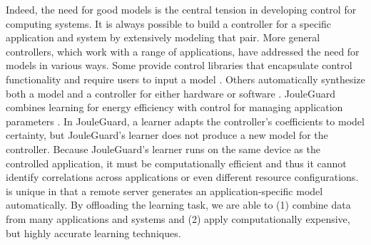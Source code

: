 Indeed, the need for good models is the central tension in developing
control for computing systems.  It is always possible to build a
controller for a specific application and system by extensively
modeling that pair.  More general controllers, which work with a range
of applications, have addressed the need for models in various ways.
Some provide control libraries that encapsulate control functionality
and require users to input a model
\cite{ControlWare,Sojka,Rajkumar,POET,SWiFT}.  Others automatically
synthesize both a model and a controller for either hardware
\cite{josep-isca2016} or software \cite{ICSE2014,FSE2015}.  JouleGuard
combines learning for energy efficiency with control for managing
application parameters \cite{JouleGuard}.  In JouleGuard, a learner
adapts the controller's coefficients to model certainty, but
JouleGuard's learner does not produce a new model for the controller.
Because JouleGuard's learner runs on the same device as the controlled
application, it must be computationally efficient and thus it cannot
identify correlations across applications or even different resource
configurations.  \SYSTEM{} is unique in that a remote server generates
an application-specific model automatically.  By offloading the
learning task, we are able to (1) combine data from many applications
and systems and (2) apply computationally expensive, but highly
accurate learning techniques.


